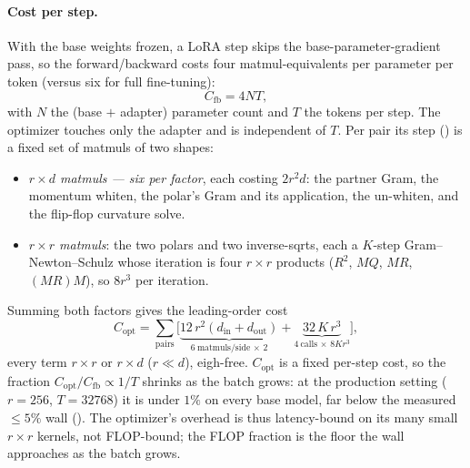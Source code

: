 \documentclass[11pt]{article}
\theoremstyle{plain}
\theoremstyle{definition}
\theoremstyle{remark}
\begin{document}
\paragraph{Cost per step.} With the base weights frozen, a LoRA step skips the
base-parameter-gradient pass, so the forward/backward costs four matmul-equivalents per
parameter per token (versus six for full fine-tuning):
\begin{equation}
  C_{\mathrm{fb}}=4NT,
  \label{eq:flop-fb}
\end{equation}
with $N$ the (base $+$ adapter) parameter count and $T$ the tokens per step. The
optimizer touches only the adapter and is independent of $T$. Per pair its step
() is a fixed set of matmuls of two shapes:
\begin{itemize}[leftmargin=1.5em,itemsep=1pt,topsep=2pt]
  \item \emph{$r\times d$ matmuls --- six per factor}, each costing $2r^2d$: the partner
        Gram, the momentum whiten, the polar's Gram and its application, the un-whiten,
        and the flip-flop curvature solve.
  \item \emph{$r\times r$ matmuls}: the two polars and two inverse-sqrts, each a
        $K$-step Gram--Newton--Schulz whose iteration is four $r\times r$ products
        ($R^2$, $MQ$, $MR$, $(MR)M$), so $8r^3$ per iteration.
\end{itemize}
Summing both factors gives the leading-order cost
\begin{equation}
  C_{\mathrm{opt}}=\sum_{\text{pairs}}\Big[
    \underbrace{12\,r^2(d_{\mathrm{in}}{+}d_{\mathrm{out}})}_{6\ \text{matmuls/side}\,\times\,2}
    +\underbrace{32\,K\,r^3}_{4\ \text{calls}\,\times\,8Kr^3}\Big],
  \label{eq:flop-opt}
\end{equation}
every term $r\times r$ or $r\times d$ ($r\ll d$), eigh-free. $C_{\mathrm{opt}}$ is a
fixed per-step cost, so the fraction $C_{\mathrm{opt}}/C_{\mathrm{fb}}\propto1/T$ shrinks
as the batch grows: at the production setting ($r{=}256$, $T{=}32768$) it is under $1\%$
on every base model, far below the measured ${\le}5\%$ wall ().
The optimizer's overhead is thus latency-bound on its many small $r\times r$ kernels, not
FLOP-bound; the FLOP fraction is the floor the wall approaches as the batch grows.
\end{document}
